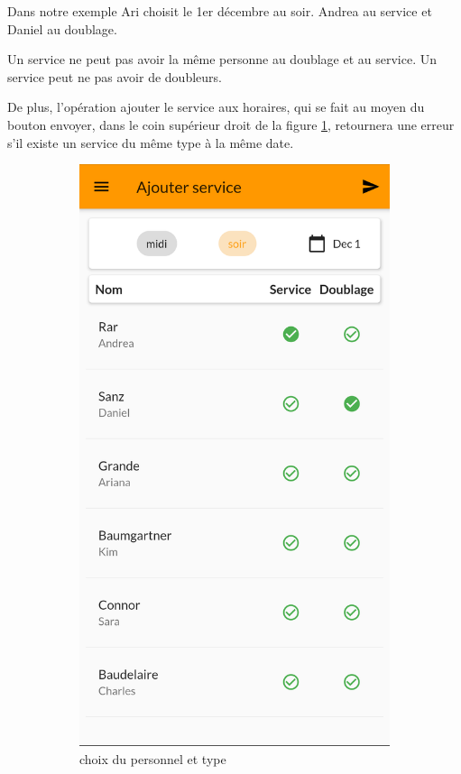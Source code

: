     \newpage
    Dans notre exemple Ari choisit le 1er décembre au soir. Andrea au service et Daniel au doublage.

    Un service ne peut pas avoir la même personne au doublage et au service. Un service peut ne pas avoir
    de doubleurs. 

    De plus, l'opération ajouter le service aux horaires, qui se fait au moyen du bouton envoyer,
    dans le coin supérieur droit de la figure \ref{fig:ajout_service_c}, retournera une erreur s'il existe un 
    service du même type à la même date.

    \begin{center}
    \begin{figure}[h]
        \centering
        \begin{subfigure}{.45\textwidth}
            \centering
            \includegraphics[width=0.6\linewidth]{screenshots/scenario_05/ajout_service_c.png}
            \caption{choix du personnel et type}
            \label{fig:ajout_service_c}
        \end{subfigure}
        \begin{subfigure}{.45\textwidth}
            \centering

\end{subfigure}
\end{figure}
\end{center}
